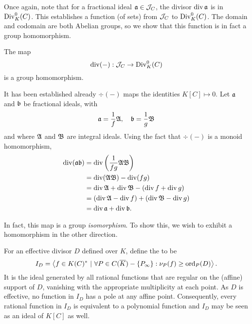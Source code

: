 Once again, note that for a fractional ideal $\frak a \in \cal J_C$,
the divisor $\div \frak a$ is in $\Div_K^0(C)$.
This establishes a function (of sets) from $\cal J_C$ to $\Div_K^0(C)$.
The domain and codomain are both Abelian groups, so we show that this function is in fact a group homomorphism.

\begin{theorem}
  The map
    \[ \div(-) : \cal J_C \to \Div_K^0(C) \]
  is a group homomorphism.
\end{theorem}
\begin{theorem}
  It has been established already $\div(-)$ maps the identities $K[C] \mapsto 0$.
  Let $\frak a$ and $\frak b$ be fractional ideals, with
  \[ \frak a = \frac 1 f \frak A, ~~~ \frak b = \frac 1 g \frak B \]
  and where $\frak A$ and $\frak B$ are integral ideals.
  Using the fact that $\div(-)$ is a monoid homomorphism,
  \begin{align*}
    \div(\frak a \frak b)
      &= \div \left( \frac 1 {fg} \frak A \frak B \right) \\
      &= \div (\frak A \frak B) - \div (fg) \\
      &= \div \frak A  + \div \frak B - (\div f + \div g) \\
      &= (\div \frak A - \div f) + (\div \frak B - \div g) \\
      &= \div \frak a + \div \frak b.
  \end{align*}
\end{theorem}

In fact, this map is a group \emph{isomorphism}.
To show this, we wish to exhibit a homomorphism in the other direction.

For an effective divisor $D$ defined over $K$, define the  to be
\[ I_D = \pid{ f \in K(C)^* ~|~ \forall P \in C(\bar K) - \{P_\infty\} : \nu_P(f) \geq \ord_P(D) }. \]
It is the ideal generated by all rational functions that are regular on the (affine) support of $D$,
vanishing with the appropriate multiplicity at each point.
As $D$ is effective, no function in $I_D$ has a pole at any affine point.
Consequently, every rational function in $I_D$ is equivalent to a polynomial function
and $I_D$ may be seen as an ideal of $K[C]$ as well.

